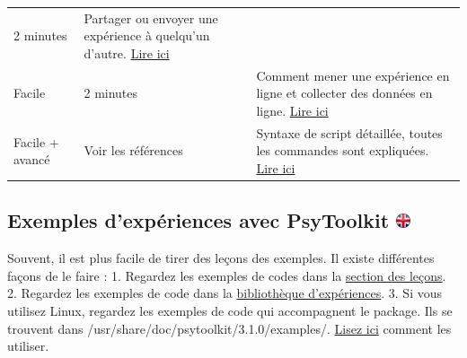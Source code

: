 \documentclass[
]{book}
\begin{document}
\begin{longtable}[]{@{}lll@{}}
\begin{minipage}[t]{0.13\columnwidth}
2 minutes\strut
\end{minipage} & \begin{minipage}[t]{0.67\columnwidth}\raggedright
Partager ou envoyer une expérience à quelqu'un d'autre. \protect\hyperlink{s4-4}{Lire ici}\strut
\end{minipage}\tabularnewline
\begin{minipage}[t]{0.11\columnwidth}\raggedright
Facile\strut
\end{minipage} & \begin{minipage}[t]{0.13\columnwidth}\raggedright
2 minutes\strut
\end{minipage} & \begin{minipage}[t]{0.67\columnwidth}\raggedright
Comment mener une expérience en ligne et collecter des données en ligne. \protect\hyperlink{s4-5}{Lire ici}\strut
\end{minipage}\tabularnewline
\begin{minipage}[t]{0.11\columnwidth}\raggedright
Facile + avancé\strut
\end{minipage} & \begin{minipage}[t]{0.13\columnwidth}\raggedright
Voir les références\strut
\end{minipage} & \begin{minipage}[t]{0.67\columnwidth}\raggedright
Syntaxe de script détaillée, toutes les commandes sont expliquées. \protect\hyperlink{s5}{Lire ici}\strut
\end{minipage}\tabularnewline
\bottomrule
\end{longtable}

\hypertarget{exemples-dexpuxe9riences-avec-psytoolkit}{%
\subsection[Exemples d'expériences avec PsyToolkit ]{\texorpdfstring{Exemples d'expériences avec PsyToolkit \href{https://www.psytoolkit.org/doc3.1.0/\#_experiments_and_surveys}{\protect\includegraphics{img/ukflag.png}}}{Exemples d'expériences avec PsyToolkit }}\label{exemples-dexpuxe9riences-avec-psytoolkit}}

Souvent, il est plus facile de tirer des leçons des exemples. Il existe différentes façons de le faire :
1. Regardez les exemples de codes dans la \href{https://www.psytoolkit.org/lessons/\#lessons4}{section des leçons}.
2. Regardez les exemples de code dans la \href{https://www.psytoolkit.org/experiment-library}{bibliothèque d'expériences}.
3. Si vous utilisez Linux, regardez les exemples de code qui accompagnent le package. Ils se trouvent dans /usr/share/doc/psytoolkit/3.1.0/examples/. \href{https://www.psytoolkit.org/linux.html\#local_examples}{Lisez ici} comment les utiliser.
\end{document}
